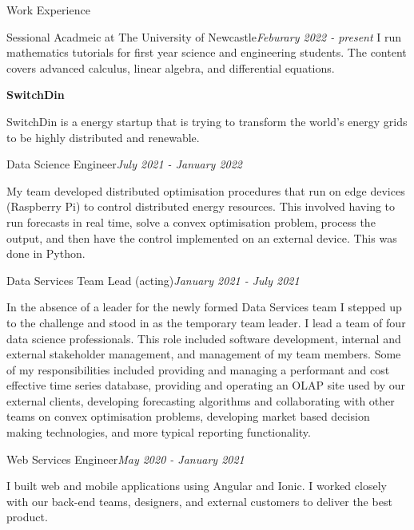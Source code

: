 \documentclass{resume} %
\begin{document}
\begin{rSection}{Work Experience}

    \begin{rSubsection}{Sessional Acadmeic at The University of Newcastle}{\em Feburary 2022 - present}{}{}
        I run mathematics tutorials for first year science and engineering students. The content covers advanced calculus, linear algebra, and differential equations.
    \end{rSubsection}

    {\bf SwitchDin}

    SwitchDin is a energy startup that is trying to transform the world's energy grids to be highly
    distributed and renewable.

    \begin{adjustwidth}{2em}{}
        \begin{rSubsection}{Data Science Engineer}{\em July 2021 - January 2022}{}{}
            \item My team developed distributed optimisation procedures that run on edge devices (Raspberry Pi) to control
            distributed energy resources. This involved having to run forecasts in real time, solve a convex optimisation problem, process the output, and
            then have the control implemented on an external device. This was done in Python.
        \end{rSubsection}

        \begin{rSubsection}{Data Services Team Lead (acting)}{\em January 2021 - July 2021}{}{}
            \item In the absence of a leader for the newly formed Data Services team I stepped up to the
            challenge and stood in as the temporary team leader. I lead a team of four data science
            professionals. This role included software development, internal and external stakeholder
            management, and management of my team members. Some of my responsibilities included providing
            and managing a performant and cost effective time series database, providing and operating an
            OLAP site used by our external clients, developing forecasting algorithms and collaborating
            with other teams on convex optimisation problems, developing market based decision making
            technologies, and more typical reporting functionality.
        \end{rSubsection}

        \begin{rSubsection}{Web Services Engineer}{\em May 2020 - January 2021}{}{}
            \item I built web and mobile applications using Angular and Ionic.
            I worked closely with our back-end teams, designers, and external customers
            to deliver the best product.
        \end{rSubsection}
    \end{adjustwidth}


\end{rSection}
\end{document}
